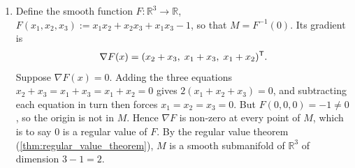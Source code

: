 \begin{exercisesolution}
\label{sol:submanifold_quadric_tangent_space}
\begin{enumerate}[label=\textbf{(\alph*)}]
  \item Define the smooth function $F : \mathbb{R}^3 \to \mathbb{R}$,
    $F(x_1,x_2,x_3) := x_1 x_2 + x_2 x_3 + x_1 x_3 - 1$, so that $M = F^{-1}(0)$. Its gradient is
\[\nabla F(x) = (x_2+x_3,\; x_1+x_3,\; x_1+x_2)^{\mathsf{T}} .\]
    Suppose $\nabla F(x) = 0$. Adding the three equations $x_2+x_3 = x_1+x_3 = x_1+x_2 = 0$ gives
    $2(x_1+x_2+x_3) = 0$, and subtracting each equation in turn then forces $x_1 = x_2 = x_3 = 0$.
    But $F(0,0,0) = -1 \neq 0$, so the origin is not in $M$. Hence $\nabla F$ is non-zero at every
    point of $M$, which is to say $0$ is a regular value of $F$. By the regular value theorem
    (\cref{thm:regular_value_theorem}), $M$ is a smooth submanifold of $\mathbb{R}^3$ of dimension
    $3 - 1 = 2$.


\end{enumerate}
\end{exercisesolution}
